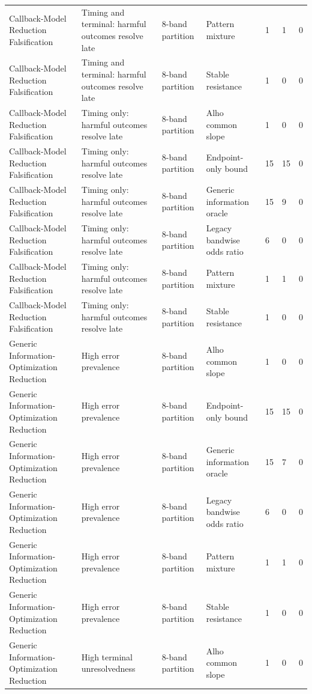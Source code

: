 \begin{tabular}{lllllll}
Callback-Model Reduction Falsification & Timing and terminal: harmful outcomes resolve late & 8-band partition & Pattern mixture & 1 & 1 & 0 \\
Callback-Model Reduction Falsification & Timing and terminal: harmful outcomes resolve late & 8-band partition & Stable resistance & 1 & 0 & 0 \\
Callback-Model Reduction Falsification & Timing only: harmful outcomes resolve late & 8-band partition & Alho common slope & 1 & 0 & 0 \\
Callback-Model Reduction Falsification & Timing only: harmful outcomes resolve late & 8-band partition & Endpoint-only bound & 15 & 15 & 0 \\
Callback-Model Reduction Falsification & Timing only: harmful outcomes resolve late & 8-band partition & Generic information oracle & 15 & 9 & 0 \\
Callback-Model Reduction Falsification & Timing only: harmful outcomes resolve late & 8-band partition & Legacy bandwise odds ratio & 6 & 0 & 0 \\
Callback-Model Reduction Falsification & Timing only: harmful outcomes resolve late & 8-band partition & Pattern mixture & 1 & 1 & 0 \\
Callback-Model Reduction Falsification & Timing only: harmful outcomes resolve late & 8-band partition & Stable resistance & 1 & 0 & 0 \\
Generic Information-Optimization Reduction & High error prevalence & 8-band partition & Alho common slope & 1 & 0 & 0 \\
Generic Information-Optimization Reduction & High error prevalence & 8-band partition & Endpoint-only bound & 15 & 15 & 0 \\
Generic Information-Optimization Reduction & High error prevalence & 8-band partition & Generic information oracle & 15 & 7 & 0 \\
Generic Information-Optimization Reduction & High error prevalence & 8-band partition & Legacy bandwise odds ratio & 6 & 0 & 0 \\
Generic Information-Optimization Reduction & High error prevalence & 8-band partition & Pattern mixture & 1 & 1 & 0 \\
Generic Information-Optimization Reduction & High error prevalence & 8-band partition & Stable resistance & 1 & 0 & 0 \\
Generic Information-Optimization Reduction & High terminal unresolvedness & 8-band partition & Alho common slope & 1 & 0 & 0 \\

\end{tabular}
